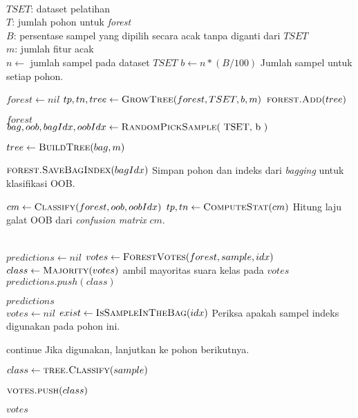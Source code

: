 \begin{center}
\label{alg:rf}
	\begin{algorithmic}[1]
\Require \\
$ TSET $: dataset pelatihan \\
$ T $: jumlah pohon untuk \textit{forest} \\
$ B $: persentase sampel yang dipilih secara acak tanpa diganti dari $TSET$ \\
$ m $: jumlah fitur acak \\

	\State $ n \gets $ jumlah sampel pada dataset $ TSET $
	\State $ b \gets n * (B / 100) $
	\Comment Jumlah sampel untuk setiap pohon.

	\State $ forest \gets nil $
		\State $ tp, tn, tree \gets \Call{GrowTree}{forest, TSET, b, m} $
		\State $ \Call{forest.Add}{tree} $
	\EndFor
	
	\State \Return $forest$
\EndFunction
\\
	\label{bagging}
	\State $ bag, oob, bagIdx, oobIdx \gets \Call{RandomPickSample}{$ TSET,
	b $} $

	\State $ tree \gets \Call{BuildTree}{bag, m} $

	\State $ \Call{forest.SaveBagIndex}{bagIdx} $
	\Comment Simpan pohon dan indeks dari \textit{bagging} untuk
	klasifikasi OOB.

	\State $ cm \gets \Call{Classify}{forest, oob, oobIdx} $
	\State $ tp, tn \gets \Call{ComputeStat}{cm} $
	\Comment Hitung laju galat OOB dari \textit{confusion matrix}
	$cm$.

	\State {}
\EndFunction
\\
	\State $ predictions \gets nil $
		\State $ votes \gets \Call{ForestVotes}{forest, sample, idx} $
		\State $ class \gets \Call{Majority}{votes} $
		\Comment ambil mayoritas suara kelas pada $votes$
		\State $ predictions.push(class) $
	\EndFor

	\State \Return $predictions$
\EndFunction
\\
	\State $ votes \gets nil $
		\State $ exist \gets \Call{IsSampleInTheBag}{idx} $
		\Comment Periksa apakah sampel indeks digunakan pada pohon ini.

			\State continue
			\Comment Jika digunakan, lanjutkan ke pohon berikutnya.
		\EndIf

		\State $ class \gets \Call{tree.Classify}{sample} $

		\State $ \Call{votes.push}{class} $
	\EndFor

	\State \Return $ votes $
\EndFunction
	\end{algorithmic}
\end{center}
